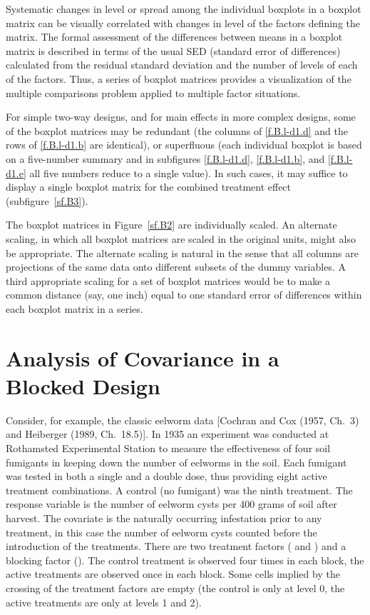 Systematic changes in level or spread among the individual
boxplots in a boxplot matrix can be visually correlated with
changes in level of the factors defining the matrix.  The formal
assessment of the differences between means in a boxplot matrix
is described in terms of the usual SED (standard error of
differences) calculated from the residual standard deviation and
the number of levels of each of the factors.  Thus, a series of
boxplot matrices provides a visualization of the multiple
comparisons problem applied to multiple factor situations.

For simple two-way designs, and for main effects in more complex
designs, some of the boxplot matrices may be redundant (the
columns of \ref{f.B.l-d1.d} and the rows of \ref{f.B.l-d1.b} are
identical), or superfluous (each individual boxplot is based on
a five-number summary and in subfigures \ref{f.B.l-d1.d},
\ref{f.B.l-d1.b}, and \ref{f.B.l-d1.e} all five numbers reduce to
a single value).  In such cases, it may suffice to display a
single boxplot matrix for the combined treatment effect
(subfigure~\ref{sf.B3}).

The boxplot matrices in Figure~\ref{sf.B2} are individually scaled.
An alternate scaling, in which all boxplot
matrices are scaled in the original units, might also be
appropriate. The alternate scaling is natural in the
sense that all columns are projections of the same data onto
different subsets of the dummy variables.
A third appropriate scaling for a set of boxplot matrices
would be to make a common distance (say, one inch) equal to one
standard error of differences within each boxplot matrix in a
series.


\section{Analysis of Covariance in a Blocked Design}
\label{sec.eelworm}

Consider, for example, the classic eelworm data
[Cochran and Cox (1957, Ch.~3) and Heiberger (1989, Ch.~18.5)].
In 1935 an experiment was conducted at Rothamsted Experimental
Station to measure the effectiveness of four soil fumigants in
keeping down the number of eelworms in the soil.
Each fumigant was tested in both
a single and a double dose, thus providing eight active
treatment combinations.  A control (no fumigant) was the ninth
treatment.  The response variable  is the number
of eelworm cysts per 400 grams of soil after harvest.  The
covariate  is the naturally occurring infestation
prior to any treatment, in this case the number of eelworm cysts
counted before the introduction of the treatments.  There are two
treatment factors ( and ) and a blocking
factor ().  The control treatment is observed four times
in each block, the active treatments are observed once in each
block.	Some cells implied by the crossing of the treatment
factors are empty (the control  is only at 
level 0, the active treatments are only at  levels 1 and
2).

